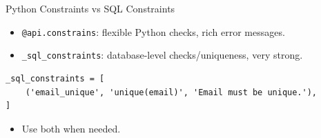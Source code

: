 \begin{frame}[fragile]{Python Constraints vs SQL Constraints}
	\begin{itemize}
		\item \texttt{@api.constrains}: flexible Python checks, rich error messages.
		\item \texttt{\_sql\_constraints}: database-level checks/uniqueness, very strong.
	\end{itemize}
\begin{lstlisting}
_sql_constraints = [
	('email_unique', 'unique(email)', 'Email must be unique.'),
]
\end{lstlisting}
	\begin{itemize}
		\item Use both when needed.
	\end{itemize}
\end{frame}
